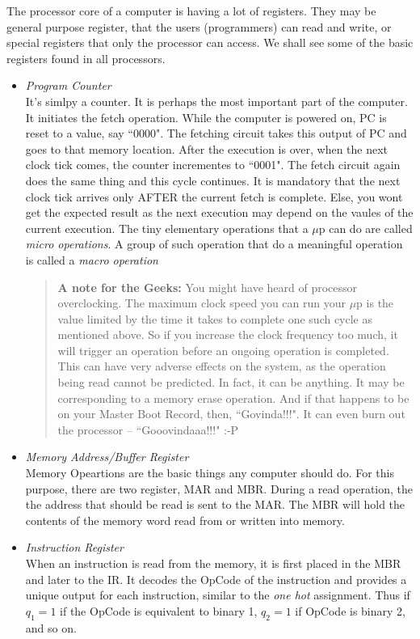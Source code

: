 \documentclass{book}
\begin{document}
The processor core of a computer is having a lot of registers. They may be
general purpose register, that the users (programmers) can read and write, or special registers
that only the processor can access. We shall see some of the basic registers
found in all processors.
\begin{itemize}
  \item \textit{Program Counter} \\[5pt]
    It\rq s simlpy a counter. It is perhaps the most important part of the
computer. It initiates the fetch operation. While the computer is powered on, PC
is reset to a value, say ``0000". The fetching circuit takes this output of PC
and goes to that memory location. After the execution is over, when the next
clock tick comes, the counter incrementes to ``0001". The fetch circuit again
does the same thing and this cycle continues. It is mandatory that the next
clock tick arrives only AFTER the current fetch is complete. Else, you wont get
the expected result as the next execution may depend on the vaules of the
current execution. The tiny elementary operations that a $\mu$p can do are
called \emph{micro operations}. A group of such operation that do a meaningful
operation is called a \emph{macro operation}
    \begin{quote}
    \textbf{A note for the Geeks:} You might have heard of processor overclocking. The maximum clock speed you can run your $\mu$p is the value limited by the
time it takes to complete one such cycle as mentioned above. So if you increase
the clock frequency too much, it will trigger an operation before an ongoing
operation is completed. This can have very adverse effects on the system, as the
operation being read cannot be predicted. In fact, it can be anything. It
may be corresponding to a memory erase operation. And if that happens to be on your
Master Boot Record, then, ``Govinda!!!". It can even burn out the processor -- ``Gooovindaaa!!!" :-P
    \end{quote}
  \item \textit{Memory Address/Buffer Register} \\[5pt]
    Memory Opeartions are the basic things any computer should do. For this
purpose, there are two register, MAR and MBR. During a read operation, the the
address that should be read is sent to the MAR. The MBR will hold the contents
of the memory word read from or written into memory.

  \item\textit{Instruction Register} \\[5pt]
  When an instruction is read from the memory, it is first placed in the MBR and
later to the IR. It decodes the OpCode of the instruction and provides a unique output for each instruction, similar to the \emph{one hot} assignment. Thus if $q_1=1$ if the OpCode is equivalent to binary 1, $q_2=1$ if OpCode is binary 2, and so on.


\end{itemize}
\end{document}
